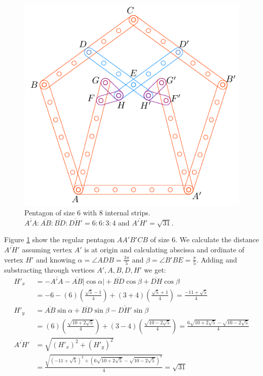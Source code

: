 \documentclass[11pt]{article}
\begin{document}
\begin{figure}[H]
\centering
\includegraphics[scale=1]{6/penta6-8a}
\caption{Pentagon of size 6 with 8 internal strips. $\overline{A'A} : \overline{AB} : \overline{BD} : \overline{DH'} = 6:6:3:4$ and $\overline{A'H'} = \sqrt{31}$.}
\label{fig:penta6-8a}
\end{figure}

Figure \ref{fig:penta6-8a} show the regular pentagon $AA'B'CB$ of size $6$. We calculate the distance $\overline{A'H'}$ assuming vertex $A'$ is at origin and calculating abscissa and ordinate of vertex $H'$ and knowing $\alpha = \angle{ADB} = \frac{3\pi}5$ and $\beta = \angle{B'BE} = \frac{\pi}5$. Adding and substracting through vertices $A',A,B,D,H'$ we get:
\begin{align}
H'_x &= -\overline{A'A} -\overline{AB}|\cos\alpha| + \overline{BD}\cos\beta + \overline{DH}\cos\beta \nonumber\\
 &= -6 -(6)\left(\frac{\sqrt5 - 1}4\right) + (3+4)\left(\frac{\sqrt5+1}4\right)
 = \frac{-11 + \sqrt5}4 \\
H'_y &= \overline{AB}\sin\alpha + \overline{BD}\sin\beta - \overline{DH'}\sin\beta \nonumber\\
 &= (6)\left(\frac{\sqrt{10+2\sqrt5}}4\right) + (3-4)\left(\frac{\sqrt{10-2\sqrt5}}4\right)
 = \frac{6\sqrt{10+2\sqrt5} - \sqrt{10-2\sqrt5}}4 \\
%
\overline{A'H'} &= \sqrt{(H'_x)^2 + (H'_y)^2} \nonumber\\
 &= \frac{\sqrt{(-11+\sqrt5)^2 + (6\sqrt{10+2\sqrt5} -\sqrt{10-2\sqrt5})^2}}4
 = \sqrt{31}
\end{align}
\end{document}

